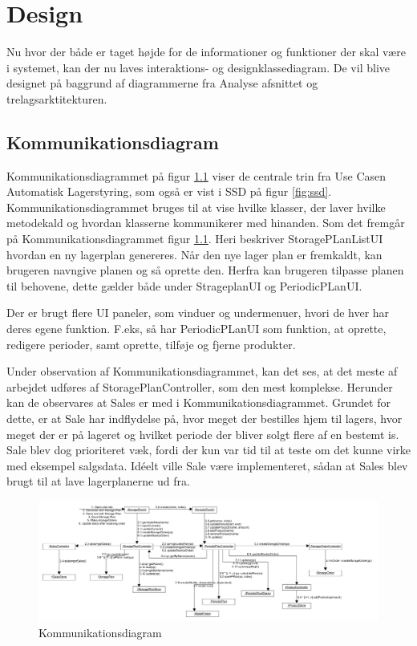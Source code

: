 \chapter{Design}\label{ch:design}
Nu hvor der både er taget højde for de informationer og funktioner der skal være i systemet, kan der nu laves interaktions- og designklassediagram. De vil blive designet på baggrund af diagrammerne fra Analyse afsnittet og trelagsarktitekturen. 

\section{Kommunikationsdiagram}
Kommunikationsdiagrammet\cite{Larman2004} på figur \ref{fig:Kommunikationsdiagram} viser de centrale trin fra Use Casen Automatisk Lagerstyring, som også er vist i SSD på figur \ref{fig:ssd}. Kommunikationsdiagrammet bruges til at vise hvilke klasser, der laver hvilke metodekald og hvordan klasserne kommunikerer med hinanden. 
Som det fremgår på Kommunikationsdiagrammet figur \ref{fig:Kommunikationsdiagram}. Heri beskriver StoragePLanListUI hvordan en ny lagerplan genereres. Når den nye lager plan er fremkaldt, kan brugeren navngive planen og så oprette den. Herfra kan brugeren tilpasse planen til behovene, dette gælder både under StrageplanUI og PeriodicPLanUI. 

Der er brugt flere UI paneler, som vinduer og undermenuer, hvori de hver har deres egene funktion. 
F.eks, så har PeriodicPLanUI som funktion, at oprette, redigere perioder, samt oprette, tilføje og fjerne produkter. 

Under observation af Kommunikationsdiagrammet, kan det ses, at det meste af arbejdet udføres af StoragePlanController, som den mest komplekse. Herunder kan de observares at Sales er med i Kommunikationsdiagrammet. Grundet for dette, er at Sale har indflydelse på, hvor meget der bestilles hjem til lagers, hvor meget der er på lageret og hvilket periode der bliver solgt flere af en bestemt is. 
Sale blev dog prioriteret væk, fordi der kun var tid til at teste om det kunne virke med eksempel salgsdata.
Idéelt ville Sale være implementeret, sådan at Sales blev brugt til at lave lagerplanerne ud fra.



\begin{landscape}
    \begin{figure}[p]
        \centering
        \includegraphics[width=0.8\hsize]{figures/design/Kommunikationsdiagram}
        \caption{Kommunikationsdiagram}
        \label{fig:Kommunikationsdiagram}
    \end{figure}
\end{landscape}

